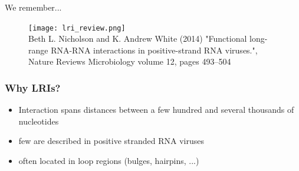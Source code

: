 \begin{frame}[c]{We remember...}
  \pause
  \begin{figure}[htbp]
    \centering
    \texttt{[image: lri\_review.png]}\\
    {\tiny Beth L. Nicholson and K. Andrew White (2014) "Functional long-range RNA-RNA interactions in positive-strand RNA viruses.",\\
     Nature Reviews Microbiology volume 12, pages 493–504}
  \end{figure}
\end{frame}


\begin{frame}[c]\frametitle{Why LRIs?}
  \begin{itemize}
    \item Interaction spans distances between a few hundred and several thousands of nucleotides
    \item few are described in positive stranded RNA viruses
    \item often located in loop regions (bulges, hairpins, ...)\\
  \end{itemize}
 \end{frame}

